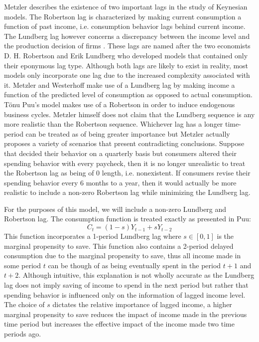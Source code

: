 Metzler describes the existence of two important lags in the study of Keynesian models. The Robertson lag is characterized by making current consumption a function of past income, i.e. consumption behavior lags behind current income. The Lundberg lag however concerns a discrepancy between the income level and the production decision of firms \autocite{Metzler1941} . These lags are named after the two economists D. H. Robertson and Erik Lundberg who developed models that contained only their eponymous lag type. Although both lags are likely to exist in reality, most models only incorporate one lag due to the increased complexity associated with it. Metzler and Westerhoff make use of a Lundberg lag by making income a function of the predicted level of consumption as opposed to actual consumption. T\"{o}nu Puu's model makes use of a Robertson in order to induce endogenous business cycles. Metzler himself does not claim that the Lundberg sequence is any more realistic than the Robertson sequence. Whichever lag has a longer time-period can be treated as of being greater importance but Metzler actually proposes a variety of scenarios that present contradicting conclusions. Suppose that decided their behavior on a quarterly basis but consumers altered their spending behavior with every paycheck, then it is no longer unrealistic to treat the Robertson lag as being of 0 length, i.e. nonexistent. If consumers revise their spending behavior every 6 months to a year, then it would actually be more realistic to include a non-zero Robertson lag while minimizing the Lundberg lag. 

For the purposes of this model, we will include a non-zero Lundberg and Robertson lag. The consumption function is treated exactly as presented in Puu:
\begin{equation}
    C_t=(1-s)Y_{t-1}+sY_{t-2}
\end{equation}
This function incorporates a 1-period Lundberg lag where $s\in[0,1]$ is the marginal propensity to save. This function also contains a 2-period delayed consumption due to the marginal propensity to save, thus all income made in some period $t$ can be though of as being eventually spent in the period $t+1$ and $t+2$. Although intuitive, this explanation is not wholly accurate as the Lundberg lag does not imply saving of income to spend in the next period but rather that spending behavior is influenced only on the information of lagged income level. The choice of $s$ dictates the relative importance of lagged income, a higher marginal propensity to save reduces the impact of income made in the previous time period but increases the effective impact of the income made two time periods ago.  

